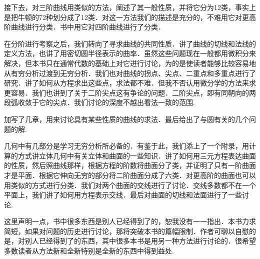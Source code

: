 接下去，对三阶曲线用类似的方法，阐述了其一般性质，并将它分为12类，事实上是把牛顿的72种划分成了12类．对这一方法我们的描述是充分的，不难用它对更高阶曲线进行分类．书中用它对四阶曲线进行了分类．

在分阶进行考察之后，我们转向了寻求曲线的共同性质．讲了曲线的切线和法线的定义方法，也讲了用密切圆半径表示的曲率．虽然这些问题现在一般都用微积分来解决，但本书只在通常代数的基础上对它进行讨论，为的是使读者能够比较容易地从有穷分析过渡到无穷分析．我们也对曲线的拐点、尖点、二重点和多重点进行了研究．讲了如何从方程求出这些点，求法都不难．但我不否认用微分学的方法来求更容易．我们也讲到了关于二阶尖点这有争论的问题．二阶尖点，即有同朝向的两段弧收敛于它的尖点．我们讨论的深度不越出看法一致的范围.

加写了几章，用来讨论具有某些性质的曲线的求法．最后给出了与圆有关的几个问题的解.

几何中有几部分是学习无穷分析所必备的．有鉴于此，我们添上了一个附录，用计算的方式讲立体几何中有关立体和曲面的一些知识．讲了如何用三元方程表达曲面的性质，然后照曲线那样，根据方程的阶数将曲面分了类，并证明了只有一阶曲面才是平面．根据它伸向无穷的部分将二阶曲面分成了六类．对更高阶的曲面也可以用类似的方式进行分类．我们对两个曲面的交线进行了讨论．交线多数都不在一个平面上，我们讲了如何用方程表示交线．最后对曲面的切线和法面进行了一些讨论.

这里声明一点，书中很多东西是别人已经得到了的，恕我没有一一指出．本书力求简短，如果对问题的历史进行讨论，那将突破本书的篇幅限制．作者可聊以自慰的是，对别人已经得到了的东西，其中很多本书是用另一种方法进行讨论的．很希望多数读者从方法新和全新特别是全新的东西中得到益处.

 